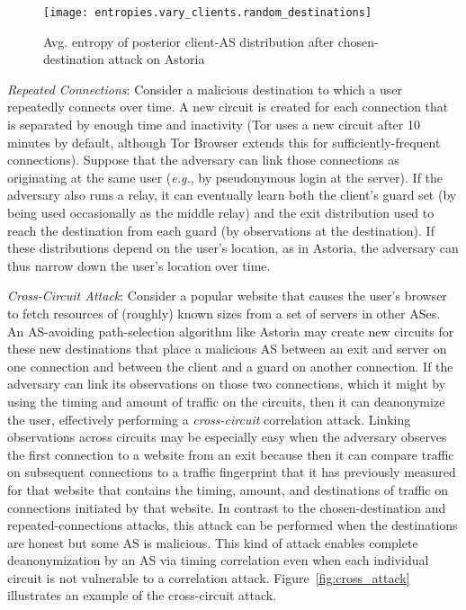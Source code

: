 \documentclass[conference]{styles/IEEEtran}
\newcommand{\eg}{\emph{e.g.}}
\begin{document}
\begin{figure}[ht]
\centering
\texttt{[image: entropies.vary\_clients.random\_destinations]}
\vspace{-4mm}
\caption{\small Avg. entropy of posterior client-AS distribution after chosen-destination attack on Astoria}
\label{fig:cda_entropy}
\vspace{-4mm}
\end{figure}


\ifarxiv

\textit{Repeated Connections}: Consider a malicious destination to which a user repeatedly
connects over time. A new circuit is created for each connection that is separated by enough
time and inactivity (Tor uses a new circuit after 10 minutes by default, although Tor
Browser extends this for sufficiently-frequent connections). Suppose that the adversary can link
those connections as originating at the same user (\eg{}, by pseudonymous login at the
server). If the adversary also runs a relay, it can eventually learn both the client's guard set
(by being used occasionally as the middle relay) and the exit distribution used to reach the
destination from each guard (by observations at the destination). If these distributions
depend on the user's location, as in Astoria, the adversary can thus narrow down the user's
location over time.

\fi


\ifarxiv

\textit{Cross-Circuit Attack}: Consider a popular website that causes the user's browser to fetch
resources of (roughly) known sizes from a set of servers in other ASes. An AS-avoiding
path-selection algorithm like Astoria may create new circuits for these new destinations that place
a malicious AS between an exit and server on one connection and between the client and
a guard on another connection. If the adversary can link its
observations on those two connections, which it might by using the timing and amount of traffic on
the circuits, then it can deanonymize the user, effectively performing a \emph{cross-circuit}
correlation attack. Linking observations across circuits may be especially easy when the adversary
observes the first connection to a website from an exit because then it can compare traffic on
subsequent connections to a traffic fingerprint that it has previously measured for that website 
that contains the timing, amount, and destinations of traffic on connections initiated by that
website. In contrast to the chosen-destination and repeated-connections attacks, this attack can
be performed when the destinations are honest but some AS is malicious. This kind of attack enables
complete deanonymization by an AS via timing correlation even when each individual circuit is not
vulnerable to a correlation attack. Figure~\ref{fig:cross_attack} illustrates an example of the
cross-circuit attack.
\end{document}
